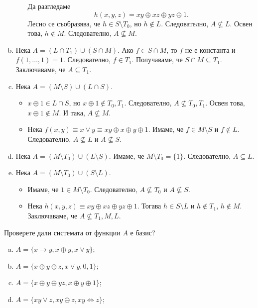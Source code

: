 \begin{solution}
\begin{enumerate}[a)]
\begin{itemize}
      Да разгледаме
      \[h(x,y,z) = xy\oplus xz \oplus yz \oplus 1.\]
      Лесно се съобразява, че $h \in S \setminus T_0$, но $h \not\in L$.
      Следователно, $A \not\subseteq L$.
      Освен това, $h \not \in M$. Следователно, $A \not\subseteq M$.
    \end{itemize}
  \item
    Нека $A = (L \cap T_1) \cup (S \cap M)$.
    Ако $f \in S \cap M$, то $f$ не е константа и $f(1,\dots,1) = 1$.
    Следователно, $f \in T_1$.
    Получаваме, че $S \cap M \subseteq T_1$.
    Заключаваме, че $A \subseteq T_1$.
  \item
    Нека $A = (M\setminus S)\cup(L\cap S)$.
    \begin{itemize}
    \item 
      $x\oplus 1 \in L \cap S$, но $x \oplus 1 \not\in T_0, T_1$.
      Следователно, $A \not\subseteq T_0,T_1$.
      Освен това, $x\oplus 1 \not\in M$.
      И така, $A \not\subseteq M$.
    \item
      Нека $f(x,y) \equiv x \vee y \equiv xy \oplus x \oplus y \oplus 1$.
      Имаме, че $f \in M \setminus S$ и $f \not\in L$.
      Следователно, $A \not\subseteq L$ и $A \not\subseteq S$.
    \end{itemize}
  \item
    Нека $A = (M \setminus T_0) \cup (L \setminus S)$.
    Имаме, че $M \setminus T_0 = \{1\}$.
    Следователно, $A \subseteq L$.
  \item
    Нека $A = (M \setminus T_0) \cup (S \setminus L)$.
    \begin{itemize}
    \item 
      Имаме, че $1 \in M\setminus T_0$.
      Следователно, $A \not\subseteq T_0$ и $A \not\subseteq S$.
    \item
      Нека $h(x,y,z) \equiv xy \oplus xz \oplus yz \oplus 1$.
      Тогава $h \in S\setminus L$ и $h \not\in T_1$, $h \not \in M$.
      Заключаваме, че $A \not\subseteq T_1, M, L$.
    \end{itemize}
  \end{enumerate}
\end{solution}

\begin{problem} %
  Проверете дали системата от функции $A$ е базис?
  \begin{enumerate}[a)]
  \item
    $A = \{x\rightarrow y, x\oplus y, x\vee y\}$;
  \item
    $A = \{x\oplus y\oplus z, x\vee y, 0, 1\}$;
  \item
    $A = \{x\oplus y\oplus yz, x \oplus y \oplus 1\}$;
  \item
    $A = \{xy \vee z, xy \oplus z, xy \iff z\}$;
  \end{enumerate}
\end{problem}

